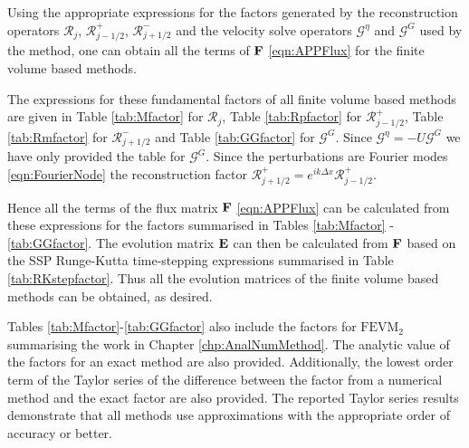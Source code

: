 Using the appropriate expressions for the factors generated by the reconstruction operators $\mathcal{R}_j$, $\mathcal{R}^+_{j-1/2}$, $\mathcal{R}^-_{j+1/2}$ and the velocity solve operators $\mathcal{G}^\eta$ and $\mathcal{G}^G$ used by the method, one can obtain all the terms of $\mathbf{F}$ \eqref{eqn:APPFlux} for the finite volume based methods.

The expressions for these fundamental factors of all finite volume based methods are given in Table \ref{tab:Mfactor} for $\mathcal{R}_j$, Table \ref{tab:Rpfactor} for $\mathcal{R}^+_{j-1/2}$, Table \ref{tab:Rmfactor} for $\mathcal{R}^-_{j+1/2}$ and Table \ref{tab:GGfactor} for $\mathcal{G}^G$. Since $\mathcal{G}^\eta = -U\mathcal{G}^G $ we have only provided the table for $\mathcal{G}^G$. Since the perturbations are Fourier modes \eqref{eqn:FourierNode} the reconstruction factor $\mathcal{R}^+_{j+1/2}= e^{ i k\Delta x}\mathcal{R}^+_{j-1/2}$. 

Hence all the terms of the flux matrix $\mathbf{F}$ \eqref{eqn:APPFlux} can be calculated from these expressions for the factors summarised in Tables \ref{tab:Mfactor} - \ref{tab:GGfactor}. The evolution matrix $\mathbf{E}$ can then be calculated from $\mathbf{F}$ based on the SSP Runge-Kutta time-stepping expressions summarised in Table \ref{tab:RKstepfactor}. Thus all the evolution matrices of the finite volume based methods can be obtained, as desired.

Tables \ref{tab:Mfactor}-\ref{tab:GGfactor} also include the factors for $\text{FEVM}_2$ summarising the work in Chapter \ref{chp:AnalNumMethod}. The analytic value of the factors for an exact method are also provided. Additionally, the lowest order term of the Taylor series of the difference between the factor from a numerical method and the exact factor are also provided. The reported Taylor series results demonstrate that all methods use approximations with the appropriate order of accuracy or better. 

